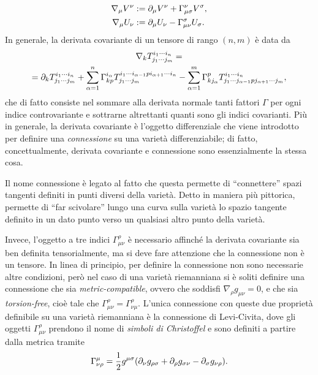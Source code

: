 \begin{align}
    \nabla_\mu V^\nu &:= \partial_\mu V^\nu + \Gamma^\nu_{\mu\sigma}V^\sigma, \\
    \nabla_\mu U_\nu &:= \partial_\mu U_\nu - \Gamma^\sigma_{\mu\nu}U_\sigma.
\end{align} 
In generale, la derivata covariante di un tensore di rango $(n,m)$ è data da
\begin{multline}
    \nabla_k T^{i_1\cdots i_n}_{j_1\cdots j_m} = \\
    = \partial_k T^{i_1\cdots i_n}_{j_1\cdots j_m} + \sum_{\alpha=1}^{n}\Gamma^{i_\alpha}_{kp}T^{i_1\cdots i_{\alpha - 1}pi_{\alpha + 1}\cdots i_n}_{j_1\cdots j_m} - \sum_{\alpha=1}^{m}\Gamma^{p}_{kj_\alpha}T^{i_1\cdots i_n}_{j_1\cdots j_{\alpha - 1}pj_{\alpha + 1}\cdots j_m},
\end{multline}
che di fatto consiste nel sommare alla derivata normale tanti fattori $\Gamma$ per ogni indice controvariante e sottrarne altrettanti quanti sono gli indici covarianti. Più in generale, la derivata covariante è l'oggetto differenziale che viene introdotto per definire una \emph{connessione} su una varietà differenziabile; di fatto, concettualmente, derivata covariante e connessione sono essenzialmente la stessa cosa. 
\begin{obs}
    Il nome connessione è legato al fatto che questa permette di ``connettere'' spazi tangenti definiti in punti diversi della varietà. Detto in maniera più pittorica, permette di ``far scivolare'' lungo una curva sulla varietà lo spazio tangente definito in un dato punto verso un qualsiasi altro punto della varietà.
\end{obs}
Invece, l'oggetto a tre indici $\Gamma^{\rho}_{\mu\nu}$ è necessario affinché la derivata covariante sia ben definita tensorialmente, ma si deve fare attenzione che la connessione non è un tensore. In linea di principio, per definire la connessione non sono necessarie altre condizioni, però nel caso di una varietà riemanniana si è soliti definire una connessione che sia \emph{metric-compatible}, ovvero che soddisfi $\nabla_\rho g_{\mu\nu} = 0$, e che sia \emph{torsion-free}, cioè tale che $\Gamma^{\rho}_{\mu\nu} = \Gamma^{\rho}_{\nu\mu}$. L'unica connessione con queste due proprietà definibile su una varietà riemanniana è la connessione di Levi-Civita, dove gli oggetti $\Gamma^{\rho}_{\mu\nu}$ prendono il nome di \emph{simboli di Christoffel} e sono definiti a partire dalla metrica tramite
\begin{equation}
    \Gamma^{\mu}_{\nu\rho} = \frac{1}{2}g^{\mu\sigma}(\partial_\nu g_{\rho\sigma} + \partial_\rho g_{\sigma\nu} - \partial_\sigma g_{\nu\rho}).
\end{equation}
